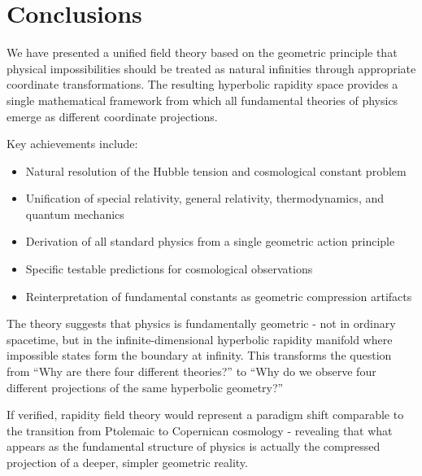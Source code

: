 \documentclass[12pt,a4paper]{article}
\begin{document}
\section{Conclusions}

We have presented a unified field theory based on the geometric principle that 
physical impossibilities should be treated as natural infinities through 
appropriate coordinate transformations. The resulting hyperbolic rapidity space 
provides a single mathematical framework from which all fundamental theories of 
physics emerge as different coordinate projections.

Key achievements include:
\begin{itemize}
    \item Natural resolution of the Hubble tension and cosmological constant problem
    \item Unification of special relativity, general relativity, thermodynamics, and quantum mechanics
    \item Derivation of all standard physics from a single geometric action principle
    \item Specific testable predictions for cosmological observations
    \item Reinterpretation of fundamental constants as geometric compression artifacts
\end{itemize}

The theory suggests that physics is fundamentally geometric - not in ordinary 
spacetime, but in the infinite-dimensional hyperbolic rapidity manifold where 
impossible states form the boundary at infinity. This transforms the question from 
``Why are there four different theories?'' to ``Why do we observe four different 
projections of the same hyperbolic geometry?''

If verified, rapidity field theory would represent a paradigm shift comparable 
to the transition from Ptolemaic to Copernican cosmology - revealing that what 
appears as the fundamental structure of physics is actually the compressed 
projection of a deeper, simpler geometric reality.
\end{document}

